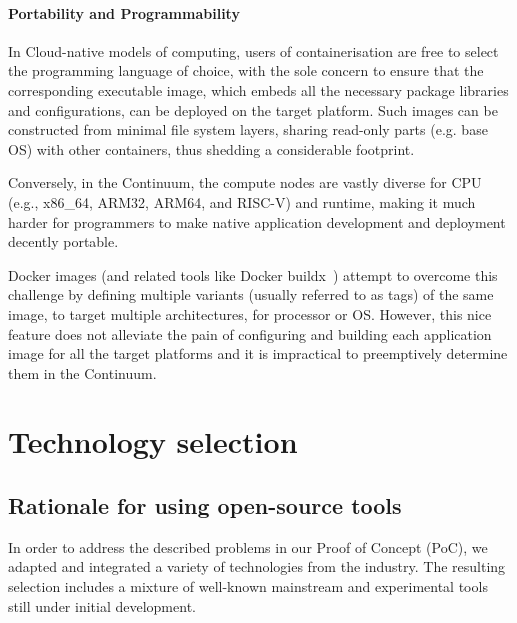 \paragraph{Portability and Programmability}\label{p:portability-and-programmability}
In Cloud-native models of computing, users of containerisation are free to select the programming language of choice, with the sole concern to ensure that the corresponding executable image, which embeds all the necessary package libraries and configurations, can be deployed on the target platform. 
Such images can be constructed from minimal file system layers, sharing read-only parts (e.g. base OS) with other containers, thus shedding a considerable footprint. 

Conversely, in the Continuum, the compute nodes are vastly diverse for CPU (e.g., x86\_64, ARM32, ARM64, and RISC-V) and runtime, making it much harder for programmers to make native application development and deployment decently portable. 

Docker images (and related tools like Docker buildx~\cite{docker-buildx}) attempt to overcome this challenge by defining multiple variants (usually referred to as tags) of the same image, to target multiple architectures, for processor or OS. 
However, this nice feature does not alleviate the pain of configuring and building each application image for all the target platforms and it is impractical to preemptively determine them in the Continuum.


\section{Technology selection}\label{sec:technology-selection}

\subsection{Rationale for using open-source tools}

In order to address the described problems in our Proof of Concept (PoC), we adapted and integrated a variety of technologies from the industry. The resulting selection includes a mixture of well-known mainstream and experimental tools still under initial development.

